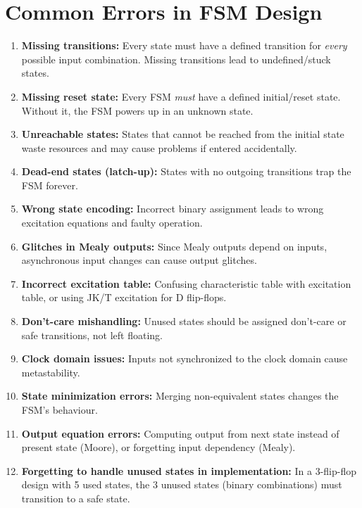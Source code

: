 \documentclass[12pt,a4paper]{article}
\begin{document}
\section{Common Errors in FSM Design}

\begin{importantbox}
\begin{enumerate}[leftmargin=*]
  \item \textbf{Missing transitions:} Every state must have a defined transition for \emph{every} possible input combination. Missing transitions lead to undefined/stuck states.

  \item \textbf{Missing reset state:} Every FSM \emph{must} have a defined initial/reset state. Without it, the FSM powers up in an unknown state.

  \item \textbf{Unreachable states:} States that cannot be reached from the initial state waste resources and may cause problems if entered accidentally.

  \item \textbf{Dead-end states (latch-up):} States with no outgoing transitions trap the FSM forever.

  \item \textbf{Wrong state encoding:} Incorrect binary assignment leads to wrong excitation equations and faulty operation.

  \item \textbf{Glitches in Mealy outputs:} Since Mealy outputs depend on inputs, asynchronous input changes can cause output glitches.

  \item \textbf{Incorrect excitation table:} Confusing characteristic table with excitation table, or using JK/T excitation for D flip-flops.

  \item \textbf{Don't-care mishandling:} Unused states should be assigned don't-care or safe transitions, not left floating.

  \item \textbf{Clock domain issues:} Inputs not synchronized to the clock domain cause metastability.

  \item \textbf{State minimization errors:} Merging non-equivalent states changes the FSM's behaviour.

  \item \textbf{Output equation errors:} Computing output from next state instead of present state (Moore), or forgetting input dependency (Mealy).

  \item \textbf{Forgetting to handle unused states in implementation:} In a 3-flip-flop design with 5 used states, the 3 unused states (binary combinations) must transition to a safe state.
\end{enumerate}
\end{importantbox}
\end{document}
